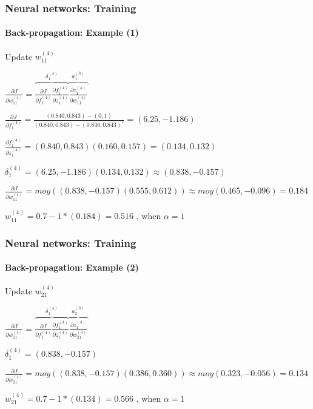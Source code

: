 \documentclass[xcolor=table]{beamer}
\begin{document}
\begin{frame}
	\frametitle{Neural networks: Training}
	\framesubtitle{Back-propagation: Example (1)}
	
	Update $w_{11}^{(4)}$
	
	$ 
	\frac{\partial J}{\partial w_{11}^{(4)}} = \overbrace{\frac{\partial J}{\partial f_{1}^{(4)}} \frac{\partial f_{1}^{(4)}}{\partial z_{1}^{(4)}}}^{\delta_{1}^{(4)}} \overbrace{\frac{\partial z_{1}^{(4)}}{\partial w_{11}^{(4)}}}^{a_{1}^{(3)}}
	$
	
	$ 
	\frac{\partial J}{\partial f_{1}^{(4)}} = \frac{(0.840, 0.843) - (0, 1)}{(0.840, 0.843) - (0.840, 0.843)^2} 
	= (6.25, -1.186)
	$
	
	$ 
	\frac{\partial f_{1}^{(4)}}{\partial z_{1}^{(4)}} = (0.840, 0.843) (0.160, 0.157) = (0.134, 0.132)
	$
	
	$
	\delta_{1}^{(4)} = (6.25, -1.186) (0.134, 0.132) \approx (0.838, -0.157)
	$
	
	$
	\frac{\partial J}{\partial w_{11}^{(4)}} = moy((0.838, -0.157) (0.555, 0.612)) 
	\approx moy(0.465, -0.096) = 0.184
	$
	
	$
	w_{11}^{(4)} = 0.7 - 1 * (0.184) = 0.516 \text{ , when } \alpha = 1
	$
	
\end{frame}

\begin{frame}
	\frametitle{Neural networks: Training}
	\framesubtitle{Back-propagation: Example (2)}
	
	Update $w_{21}^{(4)}$
	
	$ 
	\frac{\partial J}{\partial w_{21}^{(4)}} = \overbrace{\frac{\partial J}{\partial f_{1}^{(4)}} \frac{\partial f_{1}^{(4)}}{\partial z_{1}^{(4)}}}^{\delta_{1}^{(4)}} \overbrace{\frac{\partial z_{1}^{(4)}}{\partial w_{21}^{(4)}}}^{a_{2}^{(3)}}
	$
	
	
	$
	\delta_{1}^{(4)} = (0.838, -0.157)
	$
	
	$
	\frac{\partial J}{\partial w_{21}^{(4)}} = moy((0.838, -0.157) (0.386, 0.360)) 
	\approx moy(0.323, -0.056) = 0.134
	$
	
	$
	w_{21}^{(4)} = 0.7 - 1 * (0.134) = 0.566 \text{ , when } \alpha = 1
	$
	
\end{frame}
\end{document}
